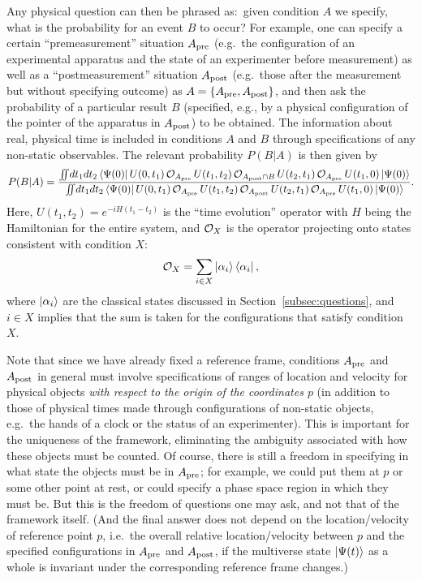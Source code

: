 \documentclass[12pt]{article}
\begin{document}
Any physical question can then be phrased as:\ given condition $A$ 
we specify, what is the probability for an event $B$ to occur? 
For example, one can specify a certain ``premeasurement'' situation 
$A_{\rm pre}$ (e.g.\ the configuration of an experimental apparatus 
and the state of an experimenter before measurement) as well as a 
``postmeasurement'' situation $A_{\rm post}$ (e.g.\ those after the 
measurement but without specifying outcome) as $A = \{ A_{\rm pre}, 
A_{\rm post} \}$, and then ask the probability of a particular result 
$B$ (specified, e.g., by a physical configuration of the pointer of 
the apparatus in $A_{\rm post}$) to be obtained.  The information 
about real, physical time is included in conditions $A$ and $B$ through 
specifications of any non-static observables.  The relevant probability 
$P(B|A)$ is then given by
%
{\small\begin{equation}
  P(B|A) = \frac{\int\!\!\!\int\!dt_1 dt_2 \bra{\Psi(0)} U(0,t_1)\, 
      {\cal O}_{A_{\rm pre}}\, U(t_1,t_2)\, {\cal O}_{A_{\rm post} \cap B}\, 
      U(t_2,t_1)\, {\cal O}_{A_{\rm pre}}\, U(t_1,0) \ket{\Psi(0)}}
    {\int\!\!\!\int\!dt_1 dt_2 \bra{\Psi(0)} U(0,t_1)\, 
      {\cal O}_{A_{\rm pre}}\, U(t_1,t_2)\, {\cal O}_{A_{\rm post}}\, 
      U(t_2,t_1)\, {\cal O}_{A_{\rm pre}}\, U(t_1,0) \ket{\Psi(0)}}.
\label{eq:prob-final}
\end{equation}}
%
Here, $U(t_1,t_2) = e^{-iH(t_1-t_2)}$ is the ``time evolution'' operator 
with $H$ being the Hamiltonian for the entire system, and ${\cal O}_X$ 
is the operator projecting onto states consistent with condition $X$:
%
\begin{equation}
  {\cal O}_X = \sum_{i \in X} \ket{\alpha_i} \bra{\alpha_i},
\label{eq:O_A-O_B}
\end{equation}
%
where $\left| \alpha_i \right>$ are the classical states discussed in 
Section~\ref{subsec:questions}, and $i \in X$ implies that the sum 
is taken for the configurations that satisfy condition $X$.

Note that since we have already fixed a reference frame, conditions 
$A_{\rm pre}$ and $A_{\rm post}$ in general must involve specifications 
of ranges of location and velocity for physical objects {\it with respect 
to the origin of the coordinates $p$} (in addition to those of physical 
times made through configurations of non-static objects, e.g.\ the hands 
of a clock or the status of an experimenter).  This is important for 
the uniqueness of the framework, eliminating the ambiguity associated 
with how these objects must be counted.  Of course, there is still a 
freedom in specifying in what state the objects must be in $A_{\rm pre}$; 
for example, we could put them at $p$ or some other point at rest, or 
could specify a phase space region in which they must be.  But this 
is the freedom of questions one may ask, and not that of the framework 
itself.  (And the final answer does not depend on the location/velocity 
of reference point $p$, i.e.\ the overall relative location/velocity 
between $p$ and the specified configurations in $A_{\rm pre}$ and 
$A_{\rm post}$, if the multiverse state $\left| \Psi(t) \right>$ as a whole 
is invariant under the corresponding reference frame changes.)
\end{document}
